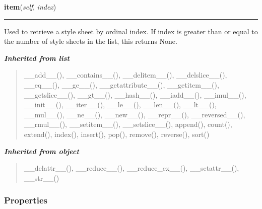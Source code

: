     \label{cssutils:stylesheets:stylesheetlist:StyleSheetList:item}

    \vspace{0.5ex}

\hspace{.8\funcindent}\begin{boxedminipage}{\funcwidth}

    \raggedright \textbf{item}(\textit{self}, \textit{index})

    \vspace{-1.5ex}

    \rule{\textwidth}{0.5\fboxrule}
\setlength{\parskip}{2ex}

Used to retrieve a style sheet by ordinal index. If index is
greater than or equal to the number of style sheets in the list,
this returns None.
\setlength{\parskip}{1ex}
    \end{boxedminipage}


\large{\textbf{\textit{Inherited from list}}}

\begin{quote}
\_\_add\_\_(), \_\_contains\_\_(), \_\_delitem\_\_(), \_\_delslice\_\_(), \_\_eq\_\_(), \_\_ge\_\_(), \_\_getattribute\_\_(), \_\_getitem\_\_(), \_\_getslice\_\_(), \_\_gt\_\_(), \_\_hash\_\_(), \_\_iadd\_\_(), \_\_imul\_\_(), \_\_init\_\_(), \_\_iter\_\_(), \_\_le\_\_(), \_\_len\_\_(), \_\_lt\_\_(), \_\_mul\_\_(), \_\_ne\_\_(), \_\_new\_\_(), \_\_repr\_\_(), \_\_reversed\_\_(), \_\_rmul\_\_(), \_\_setitem\_\_(), \_\_setslice\_\_(), append(), count(), extend(), index(), insert(), pop(), remove(), reverse(), sort()
\end{quote}

\large{\textbf{\textit{Inherited from object}}}

\begin{quote}
\_\_delattr\_\_(), \_\_reduce\_\_(), \_\_reduce\_ex\_\_(), \_\_setattr\_\_(), \_\_str\_\_()
\end{quote}


  \subsubsection{Properties}


